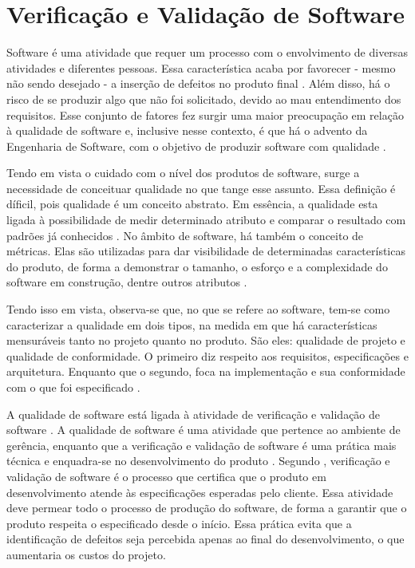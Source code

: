 \section{Verificação e Validação de Software}
Software é uma atividade que requer um processo com o envolvimento de diversas atividades e diferentes pessoas. Essa característica acaba por favorecer - mesmo não sendo desejado - a inserção de defeitos no produto final \cite{trodo2009}. Além disso, há o risco de se produzir algo que não foi solicitado, devido ao mau entendimento dos requisitos\cite{barbosaEtAl2009}. Esse conjunto de fatores fez surgir uma maior preocupação em relação à qualidade de software e, inclusive nesse contexto, é que há o advento da Engenharia de Software, com o objetivo de produzir software com qualidade \cite{buenoCampelo2013}.
\par
\indent Tendo em vista o cuidado com o nível dos produtos de software, surge a necessidade de conceituar qualidade no que tange esse assunto. Essa definição é díficil, pois qualidade é um conceito abstrato. Em essência, a qualidade esta ligada à possibilidade de medir determinado atributo e comparar o resultado com padrões já conhecidos \cite{buenoCampelo2013}. No âmbito de software, há também o conceito de métricas. Elas são utilizadas para dar visibilidade de determinadas características do produto, de forma a demonstrar o tamanho, o esforço e a complexidade do software em construção, dentre outros atributos \cite{abreu2011}.
\par
\indent Tendo isso em vista, observa-se que, no que se refere ao software, tem-se como caracterizar a qualidade em dois tipos, na medida em que há características mensuráveis tanto no projeto quanto no produto. São eles: qualidade de projeto e qualidade de conformidade. O primeiro diz respeito aos requisitos, especificações e arquitetura. Enquanto que o segundo, foca na implementação e sua conformidade com o que foi especificado \cite{buenoCampelo2013}.
\par
\indent A qualidade de software está ligada à atividade de verificação e validação de software \cite{buenoCampelo2013}. A qualidade de software é uma atividade que pertence ao ambiente de gerência, enquanto que a verificação e validação de software é uma prática mais técnica e enquadra-se no desenvolvimento do produto \cite{buenoCampelo2013}. Segundo , verificação e validação de software é o processo que certifica que o produto em desenvolvimento atende às especificações esperadas pelo cliente. Essa atividade deve permear todo o processo de produção do software, de forma a garantir que o produto respeita o especificado desde o início. Essa prática evita que a identificação de defeitos seja percebida apenas ao final do desenvolvimento, o que aumentaria os custos do projeto.
